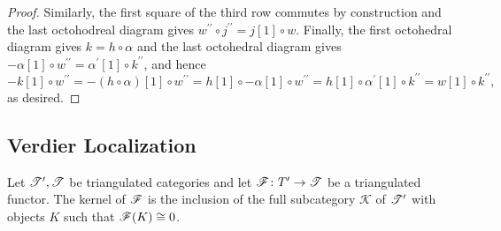 \documentclass[dissertation.tex]{subfiles}
\begin{document}
\begin{prop}
\begin{proof}
    Similarly, the first square of the third row commutes by construction and the last octohodreal diagram gives $w^{\prime\prime} \circ j^{\prime\prime} = j[1] \circ w$.
    Finally, the first octohedral diagram gives $k = h \circ \alpha$ and the last octohedral diagram gives $-\alpha[1] \circ w^{\prime\prime} = \alpha^\prime[1] \circ k^{\prime\prime}$, and hence    
    $$-k[1] \circ w^{\prime\prime} = -(h \circ \alpha)[1] \circ w^{\prime\prime} = h[1] \circ -\alpha[1] \circ w^{\prime\prime} = h[1] \circ \alpha^\prime[1] \circ k^{\prime\prime} = w[1] \circ k^{\prime\prime},$$
    as desired.
  \end{proof}
\end{prop}

\subsection{Verdier Localization}
\begin{defn}
  Let $\mathscr{T}^\prime, \mathscr{T}$ be triangulated categories and let $\mathscr{F} \colon T^\prime \rightarrow \mathscr{T}$ be a triangulated functor.
  The kernel of $\mathscr{F}$ is the inclusion of the full subcategory $\mathscr{K}$ of $\mathscr{T}^\prime$ with objects $K$ such that $\mathscr{F}(K) \cong 0$.
\end{defn}
\end{document}
